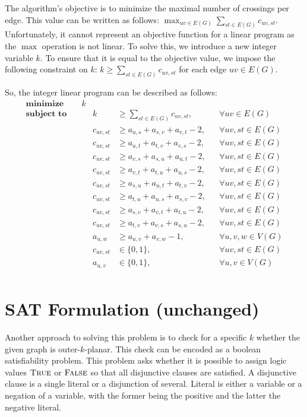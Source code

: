 The algorithm's objective is to minimize the maximal number of crossings per edge.
This value can be written as follows: $\max_{uv \in E(G)} \sum_{st \in E(G)} c_{uv, st}$.
Unfortunately, it cannot represent an objective function for a linear program as the $\max$ operation is not linear.
To solve this, we introduce a new integer variable $k$.
To ensure that it is equal to the objective value, we impose the following constraint on $k$: $k \geqslant \sum_{st \in E(G)} c_{uv, st}$ for each edge $uv \in E(G)$.

So, the integer linear program can be described as follows:
\begin{align*}
    \textbf{minimize}\quad&k\\
    \textbf{subject to}\quad&&k &\geqslant \sum_{st \in E(G)} c_{uv, st},&&\forall uv \in E(G)\\
    &&c_{uv, st} &\geqslant a_{u,s} + a_{s,v} + a_{v,t} - 2,&&\forall uv, st \in E(G)\\
    &&c_{uv, st} &\geqslant a_{u,t} + a_{t,v} + a_{v,s} - 2,&&\forall uv, st \in E(G)\\
    &&c_{uv, st} &\geqslant a_{v,s} + a_{s,u} + a_{u,t} - 2,&&\forall uv, st \in E(G)\\
    &&c_{uv, st} &\geqslant a_{v,t} + a_{t,u} + a_{u,s} - 2,&&\forall uv, st \in E(G)\\
    &&c_{uv, st} &\geqslant a_{s,u} + a_{u,t} + a_{t,v} - 2,&&\forall uv, st \in E(G)\\
    &&c_{uv, st} &\geqslant a_{t,u} + a_{u,s} + a_{s,v} - 2,&&\forall uv, st \in E(G)\\
    &&c_{uv, st} &\geqslant a_{s,v} + a_{v,t} + a_{t,u} - 2,&&\forall uv, st \in E(G)\\
    &&c_{uv, st} &\geqslant a_{t,v} + a_{v,s} + a_{s,u} - 2,&&\forall uv, st \in E(G)\\
    &&a_{u, w} &\geqslant a_{u, v} + a_{v, w} - 1,&&\forall u, v, w \in V(G)\\
    &&c_{uv, st} &\in \{0, 1\},&&\forall uv, st \in E(G)\\
    &&a_{u, v} &\in \{0, 1\},&&\forall u, v \in V(G)\\
\end{align*}

\section{SAT Formulation (unchanged)}

Another approach to solving this problem is to check for a specific $k$ whether the given graph is outer-$k$-planar.
This check can be encoded as a boolean satisfiability problem.
This problem asks whether it is possible to assign logic values $\textsc{True}$ or $\textsc{False}$ so that all disjunctive clauses are satisfied.
A disjunctive clause is a single literal or a disjunction of several.
Literal is either a variable or a negation of a variable, with the former being the positive and the latter the negative literal.


